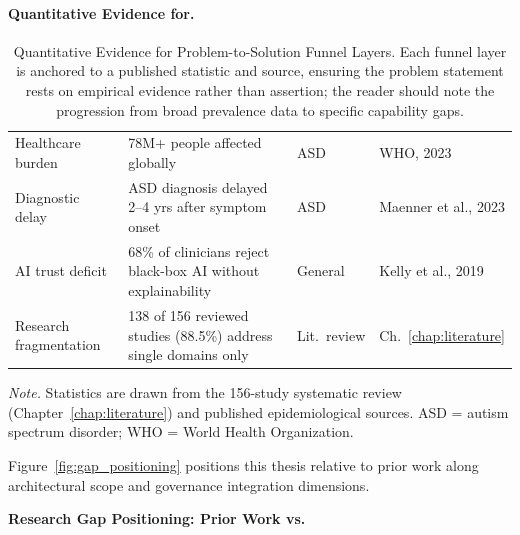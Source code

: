 \paragraph{Quantitative Evidence for.}




{\tablestripes\tablefontsize
{}
\begin{xltabular}{\textwidth}{@{} >{\raggedright\arraybackslash}p{3.5cm} p{5.6cm} >{\raggedright\arraybackslash}p{2.1cm} >{\raggedright\arraybackslash}p{2.9cm} @{}}
\caption[Quantitative Evidence for Problem-to-Solution Funnel Layers]{Quantitative Evidence for Problem-to-Solution Funnel Layers. Each funnel layer is anchored to a published statistic and source, ensuring the problem statement rests on empirical evidence rather than assertion; the reader should note the progression from broad prevalence data to specific capability gaps.}\label{tab:problem_funnel_evidence} \\
\toprule
{} &  &  &  \\
\midrule
\endfirsthead
\endhead
\bottomrule
\endlastfoot
Healthcare burden & 78M+ people affected globally & ASD & WHO, 2023 \\
\addlinespace
Diagnostic delay & ASD diagnosis delayed 2--4 yrs after symptom onset & ASD & Maenner et al., 2023 \\
\addlinespace
AI trust deficit & 68\% of clinicians reject black-box AI without explainability & General & Kelly et al., 2019 \\
\addlinespace
Research fragmentation & 138 of 156 reviewed studies (88.5\%) address single domains only & Lit.\ review & Ch.~\ref{chap:literature} \\
\end{xltabular}}
\vspace{0.5em}
\noindent\textit{Note.} Statistics are drawn from the 156-study systematic review (Chapter~\ref{chap:literature}) and published epidemiological sources. ASD = autism spectrum disorder;  WHO = World Health Organization.

Figure~\ref{fig:gap_positioning} positions this thesis relative to prior work along architectural scope and governance integration dimensions.


\noindent\textbf{Research Gap Positioning: Prior Work vs.}

